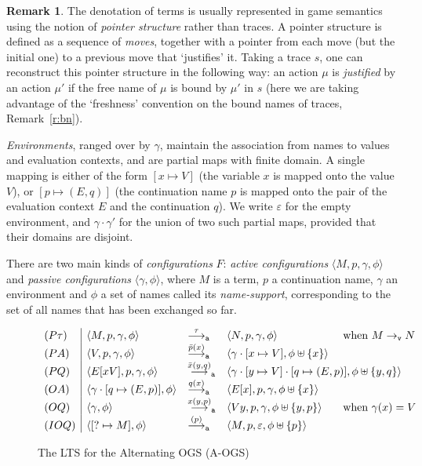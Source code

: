 \documentclass[11pt,a4paper]{amsart}
\theoremstyle{plain}
\theoremstyle{definition}
\theoremstyle{defC}
\theoremstyle{thmC}
\theoremstyle{plain}
\numberwithin{equation}{section}
\newcommand{\tr}{s}
\newcommand{\AOGS}{\mbox{{\rm A-OGS}}\xspace}      %
\newcommand{\rmm}[1]{{\tt{\lowercase{#1}}}}
\newcommand{\genarr}[2]{\mathrel{\stackrel{{#1}}{\longrightarrow}_{\rmm{\lowercase{#2}}}}}
\newcommand{\arrA}[1]{\genarr{#1}{A}}  %
\newcommand{\FF}{F}
\newcommand{\emptymap}{\varepsilon}
\newcommand{\pmap}[2]{[#1 \mapsto #2]}
\newcommand{\redv}{\rightarrow_{\tt{v}}}
\newcommand{\act}{\mu}
\newcommand{\ansP}[2]{\bar{#1}(#2)}
\newcommand{\questPV}[3]{\bar{#1}(#2,#3)}
\newcommand{\ansO}[2]{#1(#2)}
\newcommand{\questOV}[3]{#1(#2,#3)}
\newcommand{\questOinit}[1]{(#1)}
\newcommand{\conf}[1]{\langle #1\rangle}
\newcommand{\initconf}[2]{\langle[? \mapsto #2], #1\rangle}
\theoremstyle{plain}
\theoremstyle{definition}
\newtheorem{remark}[thm]{Remark}
\begin{document}
\begin{remark}
 \label{rmk:justified-sequence}
The denotation of terms is usually represented in game semantics using 
the notion of \emph{pointer structure} rather than traces.
A pointer structure is defined as a sequence of \emph{moves}, 
together with a pointer from each move (but the initial one) to a previous move 
that  `justifies' it.
Taking a trace $\tr$, one can reconstruct this pointer structure in the following way:
an action $\act$ is \emph{justified} by an action $\act'$
if the free name of $\act$ is bound by $\act'$ in $\tr$ (here we are taking advantage of
the `freshness' convention on the bound names of traces, Remark~\ref{r:bn}).
\end{remark}


\emph{Environments}, ranged over by $\gamma$, 
maintain the association from names to values and evaluation contexts, and  
 are partial maps with finite domain. A single mapping is either of the form 
$\pmap{x}{V}$
(the variable $x$ is mapped onto the  value $V$), or 
$\pmap{p}{(E,q)}$ 
(the continuation name $p$ is mapped onto the 
pair of the  evaluation context $E$ and the continuation $q$).
We write $\emptymap$ for the empty environment,
and $\gamma \cdot \gamma'$ for the union of two such partial maps,
provided that their domains are disjoint.


There are two main kinds of \emph{configurations} $\FF$:
\emph{active configurations} $\conf{M,p,\gamma,\phi}$ and 
\emph{passive configurations}
$\conf{\gamma,\phi}$, where $M$ is a term, $p$ a continuation name, 
$\gamma$ an environment and $\phi$ a set of names called its \emph{name-support},
corresponding to the set of all names that has been exchanged so far.
 

 \begin{figure}
 \[
  \begin{array}{l|llll}
   (P\tau) & \conf{M,p,\gamma,\phi} & \arrA{\ \tau \ } & 
     \conf{N,p,\gamma,\phi} & \text{ when } M \redv N\\
%
   (PA) & \conf{V,p,\gamma,\phi} & \arrA{\ansP{p}{x}} & 
     \conf{\gamma \cdot \pmap{x}{V},\phi \uplus \{x\}} \\
%
   (PQ) & \conf{E[xV],p,\gamma,\phi} & \arrA{\questPV{x}{y}{q}} & 
     \multicolumn{2}{l}{\conf{\gamma \cdot \pmap{y}{V}\cdot \pmap{q}{(E,p)},\phi 
       \uplus \{y,q\}}} \\
%
   (OA) & \conf{\gamma\cdot \pmap{q}{(E,p)},\phi} & \arrA{\ansO{q}{x}} & 
     \conf{E[x],p,\gamma,\phi \uplus \{x\}}\\
%
   (OQ) & \conf{\gamma,\phi} & \arrA{\questOV{x}{y}{p}} & 
     \conf{V y,p,\gamma,\phi \uplus \{y,p\}} & \text{ when } \gamma(x) = V\\
%
   (IOQ) & \initconf{\phi}{M} & \arrA{\questOinit{p}} &
     \conf{M,p,\emptymap,\phi \uplus \{p\}}
  \end{array}\]
 \caption{The  LTS for the  Alternating OGS (\AOGS)}
 \label{fig:seq-ogs-lts}
\end{figure}
\end{document}
